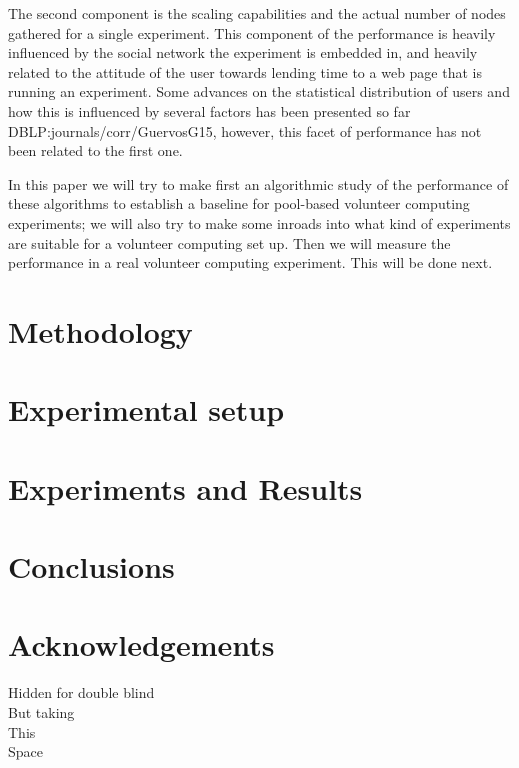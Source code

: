 \documentclass[runningheads,a4paper]{llncs}
\begin{document}
The second component is the scaling capabilities and the actual number
of nodes gathered for a single experiment. This component of the
performance is heavily influenced by the social network the experiment
is embedded in, and heavily related to the attitude of the user
towards lending time to a web page that is running an experiment. Some
advances on the statistical distribution of users and how this is
influenced by several factors has been presented so far
DBLP:journals/corr/GuervosG15, however, this facet of performance has
not been related to the first one.

In this paper we will try to make first an algorithmic study of the
performance of these algorithms to establish a baseline for pool-based
volunteer
computing experiments; we will also try to make some inroads into what
kind of experiments are suitable for a volunteer computing set
up. Then we will measure the performance in a real volunteer computing
experiment. This will be done next. 


\section{Methodology} 
\label{sec:met}


\section{Experimental setup}
\label{sec:exp}



\section{Experiments and Results}
\label{sec:res}





\section{Conclusions}

\section*{Acknowledgements}

Hidden for double blind\\
But taking\\
This\\
Space




\end{document}
